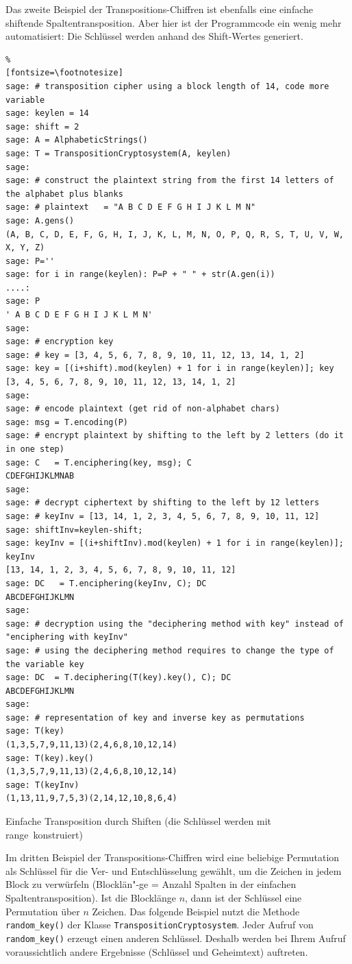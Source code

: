 \begin{refsegment}
\newpage
Das zweite Beispiel der Transpositions-Chiffren ist ebenfalls eine einfache
shiftende Spaltentransposition. Aber hier ist der Programmcode ein wenig mehr
automatisiert: Die Schlüssel werden anhand des Shift-Wertes generiert.

\begin{sagecode}
\begin{Verbatim}%
[fontsize=\footnotesize]
sage: # transposition cipher using a block length of 14, code more variable
sage: keylen = 14
sage: shift = 2
sage: A = AlphabeticStrings()
sage: T = TranspositionCryptosystem(A, keylen)
sage:
sage: # construct the plaintext string from the first 14 letters of the alphabet plus blanks
sage: # plaintext   = "A B C D E F G H I J K L M N"
sage: A.gens()
(A, B, C, D, E, F, G, H, I, J, K, L, M, N, O, P, Q, R, S, T, U, V, W, X, Y, Z)
sage: P=''
sage: for i in range(keylen): P=P + " " + str(A.gen(i))
....:
sage: P
' A B C D E F G H I J K L M N'
sage:
sage: # encryption key
sage: # key = [3, 4, 5, 6, 7, 8, 9, 10, 11, 12, 13, 14, 1, 2]
sage: key = [(i+shift).mod(keylen) + 1 for i in range(keylen)]; key
[3, 4, 5, 6, 7, 8, 9, 10, 11, 12, 13, 14, 1, 2]
sage:
sage: # encode plaintext (get rid of non-alphabet chars)
sage: msg = T.encoding(P)
sage: # encrypt plaintext by shifting to the left by 2 letters (do it in one step)
sage: C   = T.enciphering(key, msg); C
CDEFGHIJKLMNAB
sage:
sage: # decrypt ciphertext by shifting to the left by 12 letters
sage: # keyInv = [13, 14, 1, 2, 3, 4, 5, 6, 7, 8, 9, 10, 11, 12]
sage: shiftInv=keylen-shift;
sage: keyInv = [(i+shiftInv).mod(keylen) + 1 for i in range(keylen)]; keyInv
[13, 14, 1, 2, 3, 4, 5, 6, 7, 8, 9, 10, 11, 12]
sage: DC   = T.enciphering(keyInv, C); DC
ABCDEFGHIJKLMN
sage:
sage: # decryption using the "deciphering method with key" instead of "enciphering with keyInv"
sage: # using the deciphering method requires to change the type of the variable key
sage: DC  = T.deciphering(T(key).key(), C); DC
ABCDEFGHIJKLMN
sage:
sage: # representation of key and inverse key as permutations
sage: T(key)
(1,3,5,7,9,11,13)(2,4,6,8,10,12,14)
sage: T(key).key()
(1,3,5,7,9,11,13)(2,4,6,8,10,12,14)
sage: T(keyInv)
(1,13,11,9,7,5,3)(2,14,12,10,8,6,4)
\end{Verbatim}
\caption{Einfache Transposition durch Shiften (die Schlüssel werden mit
         \glqq range\grqq~konstruiert)}
\end{sagecode}

\newpage
\begin{sloppypar}
Im dritten Beispiel der Transpositions-Chiffren wird eine beliebige Permutation
als Schlüssel für die Ver- und Entschlüsselung gewählt, um die Zeichen in jedem Block
zu verwürfeln (Blocklän"-ge = Anzahl Spalten in der einfachen Spaltentransposition).
Ist die Blocklänge $n$, dann ist der Schlüssel eine Permutation über $n$ Zeichen.
Das folgende Beispiel nutzt die Methode \verb!random_key()! der Klasse
\verb!TranspositionCryptosystem!.  Jeder Aufruf von \verb!random_key()! erzeugt
einen anderen Schlüssel. Deshalb werden bei Ihrem Aufruf voraussichtlich andere
Ergebnisse (Schlüssel und Geheimtext) auftreten.
\end{sloppypar}


\end{refsegment}
